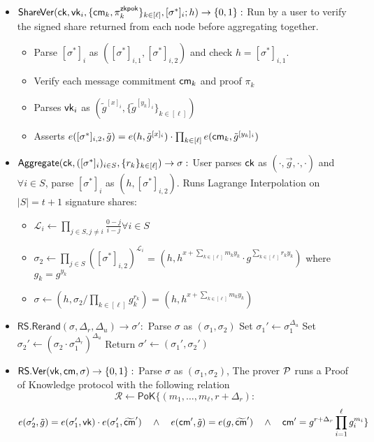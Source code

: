 \begin{itemize}
    \item $\mathsf{ShareVer}(\mathsf{ck}, \mathsf{vk}_i, \{\mathsf{cm}_k, \pi_k^{\mathsf{zkpok}}\}_{k \in [\ell]}, [\sigma^*]_i; h) \to \{0,1\}:$ Run by a user to verify the signed share returned from each node before aggregating together. 
    \begin{itemize}
        \item Parse $[\sigma^*]_i$ as $([\sigma^*]_{i,1}, [\sigma^*]_{i,2})$ and check $h = [\sigma^*]_{i,1}$. 
        \item Verify each message commitment $\mathsf{cm}_k$ and proof $\pi_k$
        \item Parses $\mathsf{vk}_i$ as $(\tilde{g}^{[x]_i}, \{\tilde{g}^{[y_k]_i}\}_{k \in [\ell]})$
        \item Asserts $e([\sigma^*]_{i,2}, \tilde{g}) = e(h, \tilde{g}^{[x]_i}) \cdot \prod_{k \in [\ell]} e(\mathsf{cm}_k, \tilde{g}^{[y_k]_i})$
    \end{itemize}

    \item $\mathsf{Aggregate}(\mathsf{ck}, ([\sigma^*]_i)_{i \in S}, \{r_k\}_{k \in [\ell]}) \to \sigma:$ User parses $\mathsf{ck}$ as $(\cdot, \vec{g}, \cdot, \cdot)$ and $\forall i \in S$, parse $[\sigma^*]_i$ as $(h, [\sigma^*]_{i,2})$. Runs Lagrange Interpolation on $|S|=t+1$ signature shares:
    \begin{itemize}
        \item  $\mathcal{L}_i \gets \prod_{j \in S, j\neq i}\frac{0-j}{i-j} \forall i \in S$
        \item $\sigma_2 \gets \prod_{j \in S}([\sigma^*]_{i,2})^{\mathcal{L}_i}$ = 
        $(h, h^{x + \sum_{k \in [\ell]} m_ky_k} \cdot g^{\sum_{k \in [\ell]} r_ky_k})$ where $g_k = g^{y_k}$
        \item $\sigma \gets (h, \sigma_2 / \prod_{k \in [\ell]}g_k^{r_k})$ = $(h, h^{x + \sum_{k \in [\ell]}m_ky_k})$
    \end{itemize}

    \item $\mathsf{RS.Rerand}(\sigma, \Delta_r, \Delta_u) \to \sigma':$
        Parse $\sigma$ as $(\sigma_1, \sigma_2)$
        Set $\sigma_1' \gets \sigma_1^{\Delta_u}$
        Set $\sigma_2' \gets (\sigma_2 \cdot \sigma_1^{\Delta_r})^{\Delta_u}$
        Return $\sigma' \gets (\sigma_1', \sigma_2')$
    
    \item $\mathsf{RS.Ver}(\mathsf{vk}, \mathsf{cm}, \sigma) \to \{0,1\}:$
        Parse $\sigma$ as $(\sigma_1, \sigma_2)$, The prover $\mathcal{P}$ runs a Proof of Knowledge protocol with the following relation 
    \[
        \mathcal{R} \gets \mathsf{PoK}\{(m_1,\ldots,m_\ell, r + \Delta_r): 
    \]
    \[
         e(\sigma_2', \tilde{g}) = e(\sigma_1', \mathsf{vk})\cdot e(\sigma_1', \widetilde{\mathsf{cm}}') \quad \wedge \quad
        e(\mathsf{cm}', \tilde{g}) = e(g, \widetilde{\mathsf{cm}}') \quad \wedge \quad
        \mathsf{cm}' = g^{r + \Delta_r} \prod_{i=1}^\ell g_i^{m_i}
        \}
    \]

\end{itemize}

